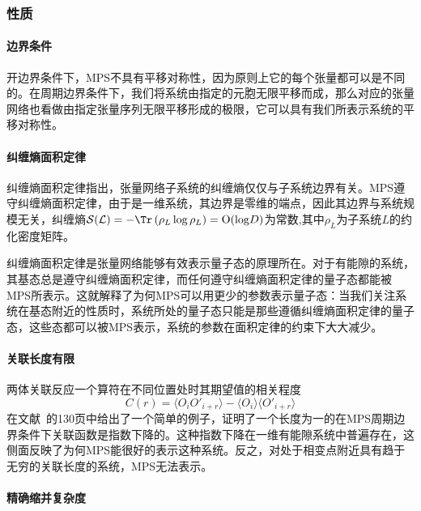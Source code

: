 \subsubsection{性质}

\paragraph{边界条件}

开边界条件下，MPS不具有平移对称性，因为原则上它的每个张量都可以是不同的。在周期边界条件下，我们将系统由指定的元胞无限平移而成，那么对应的张量网络也看做由指定张量序列无限平移形成的极限，它可以具有我们所表示系统的平移对称性。

\paragraph{纠缠熵面积定律}

纠缠熵面积定律指出，张量网络子系统的纠缠熵仅仅与子系统边界有关。MPS遵守纠缠熵面积定律，由于是一维系统，其边界是零维的端点，因此其边界与系统规模无关，纠缠熵$\mathcal{S(L)}=-\Tr\left(\rho_L\log\rho_L\right)=\mathrm{O}(\log\! D)$为常数\cite{PracticalIntroductionTensor2014},其中$\rho_L$为子系统$L$的约化密度矩阵。

纠缠熵面积定律是张量网络能够有效表示量子态的原理所在。对于有能隙的系统，其基态总是遵守纠缠熵面积定律，而任何遵守纠缠熵面积定律的量子态都能被MPS所表示\cite{eisertEntanglementTensorNetwork2013}。这就解释了为何MPS可以用更少的参数表示量子态：当我们关注系统在基态附近的性质时，系统所处的量子态只能是那些遵循纠缠熵面积定律的量子态，这些态都可以被MPS表示，系统的参数在面积定律的约束下大大减少。

\paragraph{关联长度有限}

两体关联反应一个算符在不同位置处时其期望值的相关程度
\begin{equation}
C(r) = \langle O_i O'_{i+r}\rangle - \langle O_i\rangle\langle O'_{i+r}\rangle
\end{equation}
在文献~的130页中给出了一个简单的例子，证明了一个长度为一的在MPS周期边界条件下关联函数是指数下降的。这种指数下降在一维有能隙系统中普遍存在，这侧面反映了为何MPS能很好的表示这种系统。反之，对处于相变点附近具有趋于无穷的关联长度的系统，MPS无法表示。

\paragraph{精确缩并复杂度}

